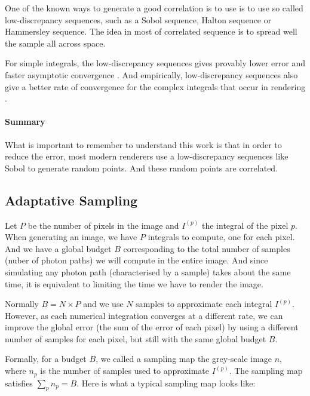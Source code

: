 \documentclass{classeENS}
\begin{document}
\par One of the known ways to generate a good correlation is to use is to 
use so called low-discrepancy sequences, 
such as a Sobol sequence, Halton sequence or Hammersley sequence. The 
idea in most of correlated sequence is to spread well the sample all across space.

For simple integrals, the low-discrepancy sequences gives provably lower error and 
faster asymptotic convergence \cite{10.1145/237170.237265}. And empirically, 
low-discrepancy sequences also give a better rate of convergence for the complex 
integrals that occur in rendering \cite{renderman}.

\paragraph*{Summary} What is important to remember to understand this work 
is that in order to reduce the error, most modern renderers use a 
low-discrepancy sequences like Sobol \cite{renderman} to generate random points.
And these random points are correlated.

\subsection{Adaptative Sampling}

\par Let $P$ be the number of pixels in the image and $I^{(p)}$ the integral of 
the pixel $p$. When generating an image, we have $P$ integrals to compute, 
one for each pixel. And we have a global budget $B$ corresponding to the 
total number of samples (nuber of photon paths) we will compute in the entire 
image. And since simulating any photon path (characterised by a sample) takes about the 
same time, it is equivalent to limiting the time we have to render the image.

\par Normally $B=N\times P$ and we use $N$ samples to approximate each integral 
$I^{(p)}$. However, as each numerical integration converges at a different 
rate, we can improve the global error (the sum of the error of each pixel) 
by using a different number of samples for each pixel, but still with the same 
global budget $B$.

\par Formally, for a budget $B$, we called a sampling map the grey-scale 
image $n$, where $n_p$ is the number of samples used to approximate 
$I^{(p)}$. The sampling map satisfies $\sum_{p} n_p = B$. Here is what a 
typical sampling map looks like:
\end{document}
